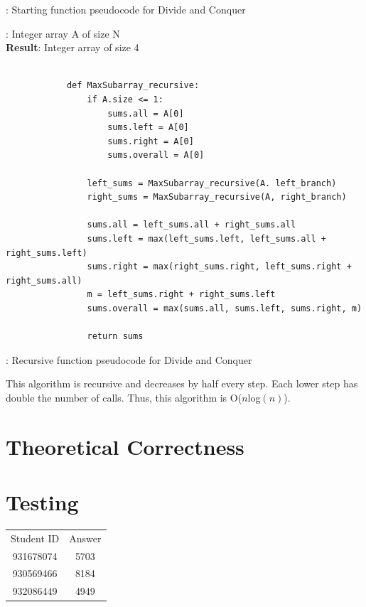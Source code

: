 \documentclass[a4paper,10pt]{article}
\begin{document}
			\begin{center}
			: Starting function pseudocode for Divide and Conquer
			\end{center}

			\vspace{1em}
			
			: Integer array A of size N \\
			{\bf Result}: Integer array of size 4

			\begin{minipage}[!h]{6in}
			\begin{verbatim}

			def MaxSubarray_recursive:
			    if A.size <= 1:
			        sums.all = A[0]
			        sums.left = A[0]
			        sums.right = A[0]
			        sums.overall = A[0]

			    left_sums = MaxSubarray_recursive(A. left_branch)
			    right_sums = MaxSubarray_recursive(A, right_branch)

			    sums.all = left_sums.all + right_sums.all
			    sums.left = max(left_sums.left, left_sums.all + right_sums.left)
			    sums.right = max(right_sums.right, left_sums.right + right_sums.all)
			    m = left_sums.right + right_sums.left
			    sums.overall = max(sums.all, sums.left, sums.right, m)

			    return sums
			\end{verbatim}
			\end{minipage}

			\begin{center}
			: Recursive function pseudocode for Divide and Conquer
			\end{center}

			\vspace{1em}

			\noindent This algorithm is recursive and decreases by half every step. Each lower step has double the number of calls. Thus, this algorithm is O($n$log$(n)$).


	\section{Theoretical Correctness}

	\section{Testing}

\begin{tabular}{ | c | c | }
  \hline
  Student ID & Answer\\
  931678074 & 5703 \\
  930569466 & 8184 \\
  932086449 & 4949 \\
  \hline  
\end{tabular}
\newpage
\end{document}
